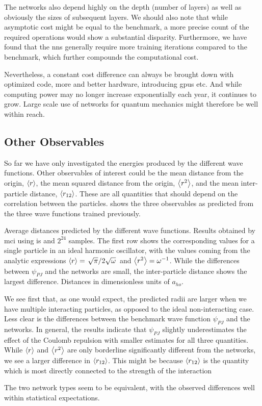 \documentclass[Thesis.tex]{subfiles}
\begin{document}
The networks also depend highly on the depth (number of layers) as
well as obviously the sizes of subsequent layers. We should also note that while
asymptotic cost might be equal to the benchmark, a more precise count of the
required operations would show a substantial disparity. Furthermore, we have
found that the \glspl{nn} generally require more training iterations compared to
the benchmark, which further compounds the computational cost.

Nevertheless, a constant cost difference can always be brought down with
optimized code, more and better hardware, introducing \glspl{gpu} etc. And while
computing power may no longer increase exponentially each year, it continues to
grow. Large scale use of networks for quantum mechanics might therefore be well
within reach.

\subsection{Other Observables}

So far we have only investigated the energies produced by the different wave
functions. Other observables of interest could be the mean distance from the origin,
$\expval{r}$, the mean squared distance from the origin, $\expval{r^2}$, and the mean
inter-particle distance, $\expval{r_{12}}$. These are all quantities that should
depend on the correlation between the particles.
 shows the three observables as predicted
from the three wave functions trained previously.

\begin{table}[h]
  \centering
  \caption[Radial metrics of different wave functions on quantum dots]{Average distances predicted by the different wave functions. Results
    obtained by \gls{mci} using \gls{is} and $2^{24}$
    samples. The first row shows the corresponding values for a single particle
    in an ideal harmonic oscillator, with the values coming from the analytic
    expressions $\expval{r}=\flatfrac{\sqrt\pi}{2\sqrt\omega}$ and
    $\expval{r^2}=\omega^{-1}$. While the differences between $\psi_{PJ}$ and
    the networks are small, the inter-particle distance shows the largest
    difference. Distances in dimensionless units of $a_{ho}$.}
  
  \label{tab:QD-mean-distance-metrics}
\end{table}
We see first that, as one would expect, the predicted radii are larger when we
have multiple interacting particles, as opposed to the ideal non-interacting
case. Less clear is the differences between the benchmark wave function
$\psi_{PJ}$ and the networks. In general, the results
indicate that $\psi_{PJ}$ slightly underestimates the effect of the Coulomb
repulsion with smaller estimates for all three quantities. While $\expval{r}$
and $\expval{r^2}$ are only borderline significantly different from the networks, we see a
larger difference in $\expval{r_{12}}$. This might
be because $\expval{r_{12}}$ is the quantity which is most directly
connected to the strength of the interaction

The two network types seem to be equivalent, with the observed differences well
within statistical expectations.
\end{document}
